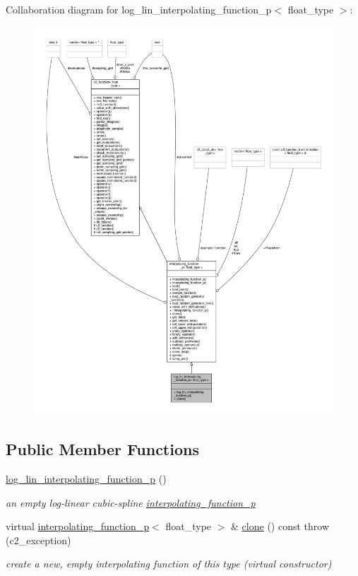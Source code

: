 Collaboration diagram for log\+\_\+lin\+\_\+interpolating\+\_\+function\+\_\+p$<$ float\+\_\+type $>$\+:
\nopagebreak
\begin{figure}[H]
\begin{center}
\leavevmode
\includegraphics[width=350pt]{classlog__lin__interpolating__function__p__coll__graph}
\end{center}
\end{figure}
\subsection*{Public Member Functions}
\begin{DoxyCompactItemize}
\item 
\hyperlink{classlog__lin__interpolating__function__p_a7275a4e792cb3895f43d84a74b03116f}{log\+\_\+lin\+\_\+interpolating\+\_\+function\+\_\+p} ()
\begin{DoxyCompactList}\small\item\em an empty log-\/linear cubic-\/spline \hyperlink{classinterpolating__function__p}{interpolating\+\_\+function\+\_\+p} \end{DoxyCompactList}\item 
virtual \hyperlink{classinterpolating__function__p}{interpolating\+\_\+function\+\_\+p}$<$ float\+\_\+type $>$ \& \hyperlink{classlog__lin__interpolating__function__p_af1c28001b280a053e9b2bdaa9fed8da6}{clone} () const   throw (c2\+\_\+exception)
\begin{DoxyCompactList}\small\item\em create a new, empty interpolating function of this type (virtual constructor) \end{DoxyCompactList}\end{DoxyCompactItemize}
